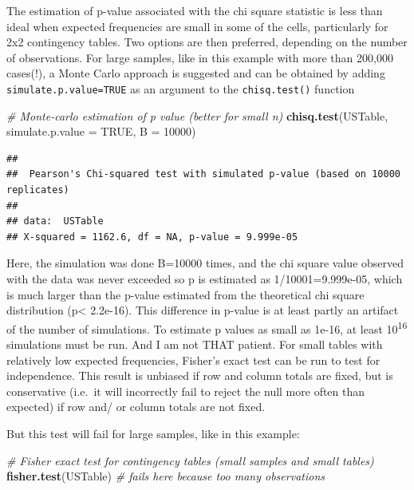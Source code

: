 \documentclass[
  12pt,
]{book}
\newenvironment{Shaded}{\begin{snugshade}}{\end{snugshade}}
\newcommand{\CommentTok}[1]{\textcolor[rgb]{0.56,0.35,0.01}{\textit{#1}}}
\newcommand{\DataTypeTok}[1]{\textcolor[rgb]{0.13,0.29,0.53}{#1}}
\newcommand{\DecValTok}[1]{\textcolor[rgb]{0.00,0.00,0.81}{#1}}
\newcommand{\KeywordTok}[1]{\textcolor[rgb]{0.13,0.29,0.53}{\textbf{#1}}}
\newcommand{\NormalTok}[1]{#1}
\newcommand{\OtherTok}[1]{\textcolor[rgb]{0.56,0.35,0.01}{#1}}
\begin{document}
The estimation of p-value associated with the chi square statistic is less than ideal when expected frequencies are small in some of the cells, particularly for 2x2 contingency tables. Two options are then preferred, depending on the number of observations. For large samples, like in this example with more than 200,000 cases(!), a Monte Carlo approach is suggested and can be obtained by adding \texttt{simulate.p.value=TRUE} as an argument to the \texttt{chisq.test()} function

\begin{Shaded}
\begin{Highlighting}[]
\CommentTok{\# Monte{-}carlo estimation of p value (better for small n)}
\KeywordTok{chisq.test}\NormalTok{(USTable, }\DataTypeTok{simulate.p.value =} \OtherTok{TRUE}\NormalTok{, }\DataTypeTok{B =} \DecValTok{10000}\NormalTok{)}
\end{Highlighting}
\end{Shaded}

\begin{verbatim}
## 
##  Pearson's Chi-squared test with simulated p-value (based on 10000 replicates)
## 
## data:  USTable
## X-squared = 1162.6, df = NA, p-value = 9.999e-05
\end{verbatim}

Here, the simulation was done B=10000 times, and the chi square value observed with the data was never exceeded so p is estimated as 1/10001=9.999e-05, which is much larger than the p-value estimated from the theoretical chi square distribution (p\textless{} 2.2e-16). This difference in p-value is at least partly an artifact of the number of simulations. To estimate p values as small as 1e-16, at least 10\textsuperscript{16} simulations must be run. And I am not THAT patient. For small tables with relatively low expected frequencies, Fisher's exact test can be run to test for independence. This result is unbiased if row and column totals are fixed, but is conservative (i.e.~it will incorrectly fail to reject the null more often than expected) if row and/ or column totals are not fixed.

But this test will fail for large samples, like in this example:

\begin{Shaded}
\begin{Highlighting}[]
\CommentTok{\# Fisher exact test for contingency tables (small samples and small tables)}
\KeywordTok{fisher.test}\NormalTok{(USTable) }\CommentTok{\# fails here because too many observations}
\end{Highlighting}
\end{Shaded}
\end{document}
